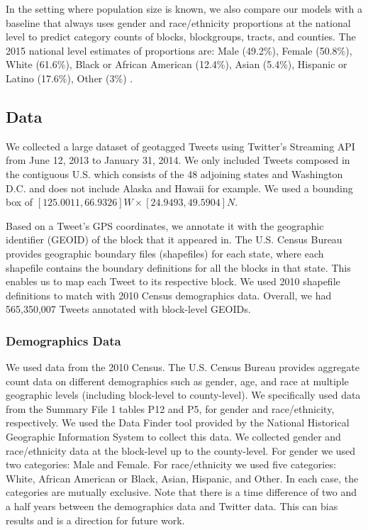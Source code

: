 \documentclass[letterpaper]{article}
\begin{document}
In the setting where population size is known, we also compare our models with a baseline that always uses gender and race/ethnicity proportions at the national level to predict category counts of blocks, blockgroups, tracts, and counties. The 2015 national level estimates of proportions are: Male (49.2\%), Female (50.8\%), White (61.6\%), Black or African American (12.4\%), Asian (5.4\%), Hispanic or Latino (17.6\%), Other (3\%) \cite{census2016}.

\subsection{Data}

We collected a large dataset of geotagged Tweets using Twitter's Streaming API from June 12, 2013 to January 31, 2014. We only included Tweets composed in the contiguous U.S. which consists of the 48 adjoining states and Washington D.C. and does not include Alaska and Hawaii for example. We used a bounding box of $[125.0011,66.9326]W \times [24.9493,49.5904]N$.

Based on a Tweet's GPS coordinates, we annotate it with the geographic identifier (GEOID) of the block that it appeared in. The U.S. Census Bureau provides geographic boundary files (shapefiles) for each state, where each shapefile contains the boundary definitions for all the blocks in that state. This enables us to map each Tweet to its respective block. We used 2010 shapefile definitions to match with 2010 Census demographics data. Overall, we had 565,350,007 Tweets annotated with block-level GEOIDs.

\subsubsection{Demographics Data} We used data from the 2010 Census. The U.S. Census Bureau provides aggregate count data on different demographics such as gender, age, and race at multiple geographic levels (including block-level to county-level). We specifically used data from the Summary File 1 tables P12 and P5, for gender and race/ethnicity, respectively. We used the Data Finder tool provided by the National Historical Geographic Information System \cite{data2010} to collect this data. We collected gender and race/ethnicity data at the block-level up to the county-level. For gender we used two categories: Male and Female. For race/ethnicity we used five categories: White, African American or Black, Asian, Hispanic, and Other. In each case, the categories are mutually exclusive. Note that there is a time difference of two and a half years between the demographics data and Twitter data. This can bias results and is a direction for future work.
\end{document}
